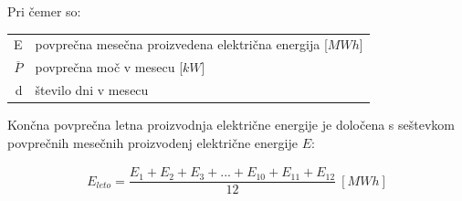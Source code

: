 Pri čemer so:
\begin{table}[htb!]
\begin{tabular}{r|p{10cm}}
	E & povprečna mesečna proizvedena električna energija [$MWh$]\\
	$\overline{P}$ & povprečna moč v mesecu [$kW$]\\
	d & število dni v mesecu \\
\end{tabular}
\end{table}


Končna povprečna letna proizvodnja električne energije je določena s seštevkom povprečnih mesečnih proizvodenj električne energije $E$:

\begin{ceqn}
\begin{align}
 E_{leto} =  \dfrac{E_1 + E_2 + E_3 + ... + E_{10} + E_{11} + E_{12}}{12} ~[MWh]
\end{align}
\end{ceqn}

